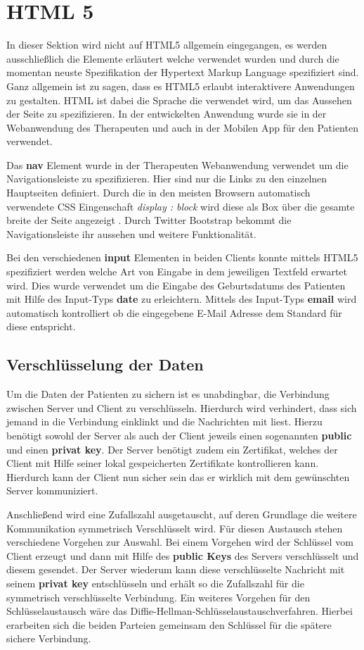 \section{HTML 5}
In dieser Sektion wird nicht auf HTML5 allgemein eingegangen, es werden ausschließlich die Elemente erläutert welche verwendet wurden und durch die momentan neuste Spezifikation der Hypertext Markup Language spezifiziert sind. Ganz allgemein ist zu sagen, dass es HTML5 erlaubt interaktivere Anwendungen zu gestalten. HTML ist dabei die Sprache die verwendet wird, um das Aussehen der Seite zu spezifizieren. In der entwickelten Anwendung wurde sie in der Webanwendung des Therapeuten und auch in der Mobilen App für den Patienten verwendet.

Das \textbf{nav} Element wurde in der Therapeuten Webanwendung verwendet um die Navigationsleiste zu spezifizieren. Hier sind nur die Links zu den einzelnen Hauptseiten definiert. Durch die in den meisten Browsern automatisch verwendete CSS Eingenschaft \textit{display : block} wird diese als Box über die gesamte breite der Seite angezeigt \cite{SELFHTMLD16}. Durch Twitter Bootstrap bekommt die Navigationsleiste ihr aussehen und weitere Funktionalität.

Bei den verschiedenen \textbf{input} Elementen in beiden Clients konnte mittels HTML5 spezifiziert werden welche Art von Eingabe in dem jeweiligen Textfeld erwartet wird. Dies wurde verwendet um die Eingabe des Geburtsdatums des Patienten mit Hilfe des Input-Typs \textbf{date} zu erleichtern. Mittels des Input-Typs \textbf{email} wird automatisch kontrolliert ob die eingegebene E-Mail Adresse dem Standard für diese entspricht.

\subsection{Verschlüsselung der Daten}
Um die Daten der Patienten zu sichern ist es unabdingbar, die Verbindung zwischen Server und Client zu verschlüsseln. Hierdurch wird verhindert, dass sich jemand in die Verbindung einklinkt und die Nachrichten mit liest. 
Hierzu benötigt sowohl der Server als auch der Client jeweils einen sogenannten \textbf{public} und einen \textbf{privat key}. Der Server benötigt zudem ein Zertifikat, welches der Client mit Hilfe seiner lokal gespeicherten Zertifikate kontrollieren kann. Hierdurch kann der Client nun sicher sein das er wirklich mit dem gewünschten Server kommuniziert.

Anschließend wird eine Zufallszahl ausgetauscht, auf deren Grundlage die weitere Kommunikation symmetrisch Verschlüsselt wird. Für diesen Austausch stehen verschiedene Vorgehen zur Auswahl. Bei einem Vorgehen wird der Schlüssel vom Client erzeugt und dann mit Hilfe des \textbf{public Keys} des Servers verschlüsselt und diesem gesendet. Der Server wiederum kann diese verschlüsselte Nachricht mit seinem \textbf{privat key} entschlüsseln und erhält so die Zufallszahl für die symmetrisch verschlüsselte Verbindung. Ein weiteres Vorgehen für den Schlüsselaustausch wäre das Diffie-Hellman-Schlüsselaustauschverfahren. Hierbei erarbeiten sich die beiden Parteien gemeinsam den Schlüssel für die spätere sichere Verbindung.

